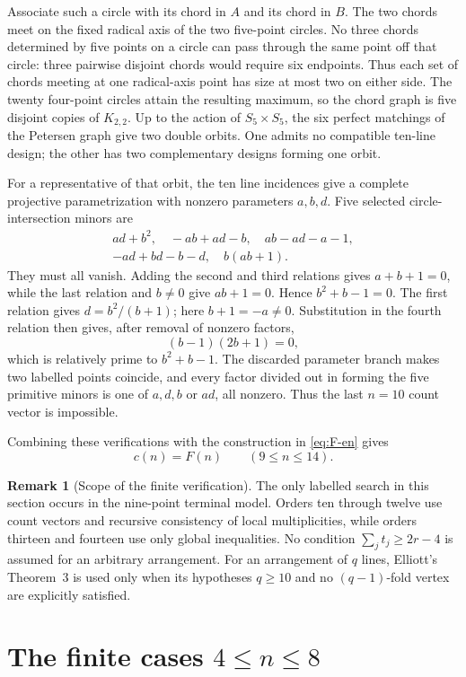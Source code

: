 \documentclass[11pt,a4paper]{article}
\theoremstyle{definition}
\newtheorem{remark}[theorem]{Remark}
\begin{document}
Associate such a circle with its chord in $A$ and its chord in $B$.  The two
chords meet on the fixed radical axis of the two five-point circles.  No three
chords determined by five points on a circle can pass through the same point
off that circle: three pairwise disjoint chords would require six endpoints.
Thus each set of chords meeting at one radical-axis point has size at most two
on either side.  The twenty four-point circles attain the resulting maximum,
so the chord graph is five disjoint copies of $K_{2,2}$.  Up to the action of
$S_5\times S_5$, the six perfect matchings of the Petersen graph give two
double orbits.  One admits no compatible ten-line design; the other has two
complementary designs forming one orbit.

For a representative of that orbit, the ten line incidences give a complete
projective parametrization with nonzero parameters $a,b,d$.  Five selected
circle-intersection minors are
\begin{gather*}
 ad+b^2,\quad -ab+ad-b,\quad ab-ad-a-1,\\
 -ad+bd-b-d,\quad b(ab+1).
\end{gather*}
They must all vanish.  Adding the second and third relations gives
$a+b+1=0$, while the last relation and $b\ne0$ give $ab+1=0$.  Hence
$b^2+b-1=0$.  The first relation gives
$d=b^2/(b+1)$; here $b+1=-a\ne0$.  Substitution in the fourth relation then
gives, after removal of nonzero factors,
\[
 (b-1)(2b+1)=0,
\]
which is relatively prime to $b^2+b-1$.  The discarded parameter branch makes
two labelled points coincide, and every factor divided out in forming the
five primitive minors is one of $a,d,b$ or $ad$, all nonzero.  Thus the last
$n=10$ count vector is impossible.

Combining these verifications with the construction in \eqref{eq:F-en} gives
\[
 c(n)=F(n)\qquad(9\le n\le14).
\]

\begin{remark}[Scope of the finite verification]
The only labelled search in this section occurs in the nine-point terminal
model.  Orders ten through twelve use count vectors and recursive consistency
of local multiplicities, while orders thirteen and fourteen use only global inequalities.
No condition $\sum_jt_j\ge2r-4$ is assumed for an arbitrary arrangement.
For an arrangement of $q$ lines, Elliott's Theorem~3 is used only when its
hypotheses $q\ge10$ and no $(q-1)$-fold vertex are explicitly satisfied.
\end{remark}


\section{The finite cases \texorpdfstring{$4\le n\le8$}{4<=n<=8}}
\end{document}
